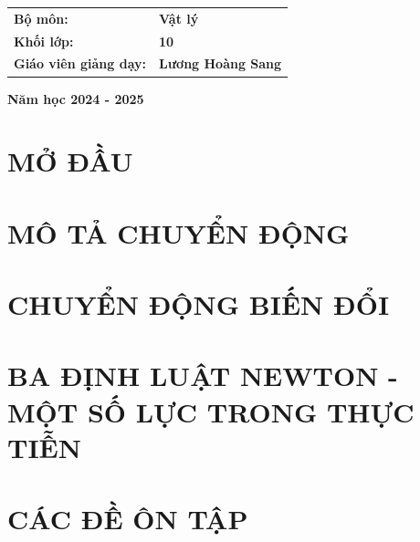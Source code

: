 \documentclass[twoside,12pt]{report}
\begin{document}
\begin{titlepage}
		\vspace{1cm}
		\begin{center}
			\fontsize{13pt}{17pt}\selectfont 
			\begin{tabular}{L{5cm}L{4.5cm}}
				\textbf{Bộ môn:}&\textbf{Vật lý}\\
				\textbf{Khối lớp:}&\textbf{10}\\
				\textbf{Giáo viên giảng dạy:}& \textbf{Lương Hoàng Sang}\\
			\end{tabular}
		\end{center}
		
		\vspace{4cm}
		
		\begin{center}
			\fontsize{13pt}{17pt}\selectfont 
			\textbf{Năm học 2024 - 2025}
		\end{center}
	\end{titlepage}
	\newpage
	\tableofcontents
	\cleardoublepage

%
\setcounter{part}{0}
\pagestyle{fancy}
\part{MỞ ĐẦU}

\part{MÔ TẢ CHUYỂN ĐỘNG}
\part{CHUYỂN ĐỘNG BIẾN ĐỔI}
\part{BA ĐỊNH LUẬT NEWTON - MỘT SỐ LỰC TRONG THỰC TIỄN}
\newpage
\newpage
\setcounter{part}{-1}
\part{CÁC ĐỀ ÔN TẬP}
\end{document}
